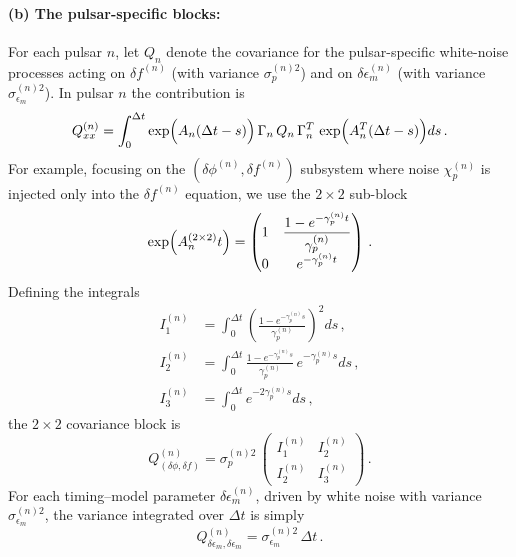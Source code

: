\documentclass[]{scrartcl}
\begin{document}
	\paragraph{(b) The pulsar-specific blocks:}  
	For each pulsar \(n\), let \(Q_n\) denote the covariance for the pulsar-specific white-noise processes acting on \(\delta f^{(n)}\) (with variance \(\sigma_{p}^{(n)2}\)) and on \(\delta\epsilon_m^{(n)}\) (with variance \(\sigma_{\epsilon_m}^{(n)2}\)). In pulsar \(n\) the contribution is
	\begin{equation}
	Q_{xx}^{(n)} = \int_{0}^{\Delta t} \exp\Bigl(A_n (\Delta t-s)\Bigr) \, \Gamma_n \, Q_n \, \Gamma_n^T \, \exp\Bigl(A_n^T (\Delta t-s)\Bigr) ds\,.
	\end{equation}
	For example, focusing on the \((\delta\phi^{(n)}, \delta f^{(n)})\) subsystem where noise \(\chi_p^{(n)}\) is injected only into the \(\delta f^{(n)}\) equation, we use the \(2 \times 2\) sub-block
	\begin{equation}
	\exp\Bigl(A_n^{(2\times2)}t\Bigr)
	= \begin{pmatrix}
	1 & \dfrac{1 - e^{-\gamma_p^{(n)} t}}{\gamma_p^{(n)}} \\[1mm]
	0 & e^{-\gamma_p^{(n)} t}
	\end{pmatrix}\,.
	\end{equation}
	Defining the integrals
	\begin{align}
	I_1^{(n)} &= \int_0^{\Delta t} \left(\frac{1 - e^{-\gamma_p^{(n)} s}}{\gamma_p^{(n)}}\right)^2 ds\,,\\[1mm]
	I_2^{(n)} &= \int_0^{\Delta t} \frac{1 - e^{-\gamma_p^{(n)} s}}{\gamma_p^{(n)}} \, e^{-\gamma_p^{(n)} s} ds\,,\\[1mm]
	I_3^{(n)} &= \int_0^{\Delta t} e^{-2\gamma_p^{(n)} s} ds\,,
	\end{align}
	the \(2 \times 2\) covariance block is
	\begin{equation}
	Q^{(n)}_{(\delta\phi,\delta f)} = \sigma_{p}^{(n)2}\,
	\begin{pmatrix}
	I_1^{(n)} & I_2^{(n)} \\[1mm]
	I_2^{(n)} & I_3^{(n)}
	\end{pmatrix}\,.
	\end{equation}
	For each timing–model parameter \(\delta\epsilon_m^{(n)}\), driven by white noise with variance \(\sigma_{\epsilon_m}^{(n)2}\), the variance integrated over \(\Delta t\) is simply
	\begin{equation}
	Q^{(n)}_{\delta\epsilon_m,\delta\epsilon_m} = \sigma_{\epsilon_m}^{(n)2}\,\Delta t\,.
	\end{equation}
\end{document}
